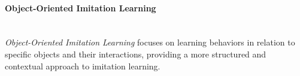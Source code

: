 \paragraph*{Object-Oriented Imitation Learning}\mbox{}\\
\textit{Object-Oriented Imitation Learning} focuses on learning behaviors in relation to specific objects and their interactions, providing a more structured and contextual approach to imitation learning.